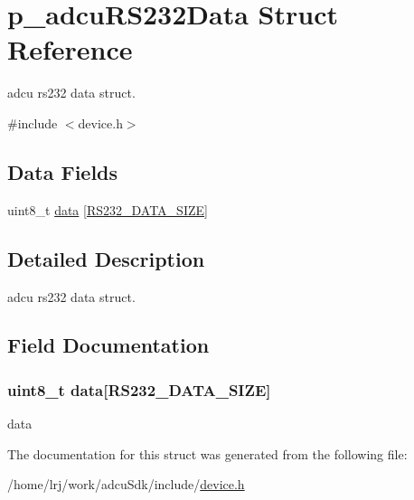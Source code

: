 \hypertarget{structp__adcuRS232Data}{}\section{p\+\_\+adcu\+R\+S232\+Data Struct Reference}
\label{structp__adcuRS232Data}


adcu rs232 data struct.  




{\ttfamily \#include $<$device.\+h$>$}

\subsection*{Data Fields}
\begin{DoxyCompactItemize}
\item 
uint8\+\_\+t \hyperlink{structp__adcuRS232Data_add44b908d31f27690479fb46abb54490}{data} \mbox{[}\hyperlink{device_8h_ab7cc37e6a1411fb4e307828c19533c77}{R\+S232\+\_\+\+D\+A\+T\+A\+\_\+\+S\+I\+ZE}\mbox{]}
\end{DoxyCompactItemize}


\subsection{Detailed Description}
adcu rs232 data struct. 

\subsection{Field Documentation}
\subsubsection[{\texorpdfstring{data}{data}}]{\setlength{\rightskip}{0pt plus 5cm}uint8\+\_\+t data\mbox{[}{\bf R\+S232\+\_\+\+D\+A\+T\+A\+\_\+\+S\+I\+ZE}\mbox{]}}\hypertarget{structp__adcuRS232Data_add44b908d31f27690479fb46abb54490}{}\label{structp__adcuRS232Data_add44b908d31f27690479fb46abb54490}
data 

The documentation for this struct was generated from the following file\+:\begin{DoxyCompactItemize}
\item 
/home/lrj/work/adcu\+Sdk/include/\hyperlink{device_8h}{device.\+h}\end{DoxyCompactItemize}
